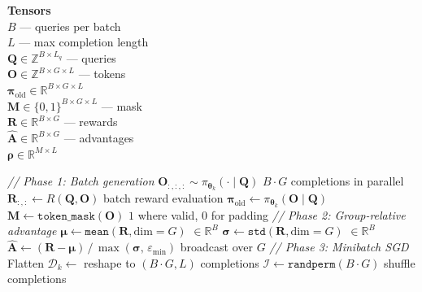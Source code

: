 \documentclass[11pt]{article}
\begin{document}
\begin{algorithm}[p]
\begin{minipage}[t]{0.28\linewidth}
\vspace{6pt}
\textbf{Tensors} \\[2pt]
$B$ --- queries per batch \\
$L$ --- max completion length \\[3pt]
$\mathbf{Q} \in \mathbb{Z}^{B \times L_q}$ --- queries \\
$\mathbf{O} \in \mathbb{Z}^{B \times G \times L}$ --- tokens \\
$\boldsymbol{\pi}_{\text{old}} \in \mathbb{R}^{B \times G \times L}$ \\
$\mathbf{M} \in \{0,1\}^{B \times G \times L}$ --- mask \\
$\mathbf{R} \in \mathbb{R}^{B \times G}$ --- rewards \\
$\hat{\mathbf{A}} \in \mathbb{R}^{B \times G}$ --- advantages \\
$\boldsymbol{\rho} \in \mathbb{R}^{M \times L}$
\end{minipage}%
\hfill
\vrule
\hfill
\begin{minipage}[t]{0.68\linewidth}
\begin{algorithmic}[1]
    \Statex \hspace{\algorithmicindent}\textit{// Phase 1: Batch generation}
        \State $\mathbf{O}_{:,:,:} \sim \pi_{\boldsymbol{\theta}_k}(\cdot \mid \mathbf{Q})$ \hfill $B \!\cdot\! G$ completions in parallel
        \State $\mathbf{R}_{:,:} \gets R(\mathbf{Q}, \mathbf{O})$ \hfill batch reward evaluation
        \State $\boldsymbol{\pi}_{\text{old}} \gets \pi_{\boldsymbol{\theta}_k}(\mathbf{O} \mid \mathbf{Q})$
        \State $\mathbf{M} \gets \texttt{token\_mask}(\mathbf{O})$ \hfill $1$ where valid, $0$ for padding
    \EndFor
    \Statex \hspace{\algorithmicindent}\textit{// Phase 2: Group-relative advantage}
    \State $\boldsymbol{\mu} \gets \texttt{mean}(\mathbf{R}, \text{dim}=G)$ \hfill $\in \mathbb{R}^{B}$
    \State $\boldsymbol{\sigma} \gets \texttt{std}(\mathbf{R}, \text{dim}=G)$ \hfill $\in \mathbb{R}^{B}$
    \State $\hat{\mathbf{A}} \gets (\mathbf{R} - \boldsymbol{\mu}) \,/\, \max(\boldsymbol{\sigma},\, \varepsilon_{\min})$ \hfill broadcast over $G$
    \Statex \hspace{\algorithmicindent}\textit{// Phase 3: Minibatch SGD}
    \State Flatten $\mathcal{D}_k \gets$ reshape to $(B \!\cdot\! G, L)$ completions
        \State $\mathcal{I} \gets \texttt{randperm}(B \!\cdot\! G)$ \hfill shuffle completions

\end{algorithmic}
\end{minipage}
\end{algorithm}
\end{document}
